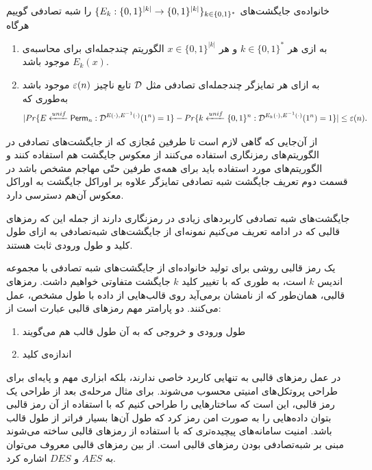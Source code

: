 \begin{definition}
خانواده‌ی جایگشت‌های 
$\{E_{k}:\{0, 1\}^{|k|}\rightarrow \{0, 1\}^{|k|}\}_{k\in\{0, 1\}^{\ast}}$
را شبه تصادفی گوییم هرگاه
\begin{enumerate}
\item
به ازی هر 
$k\in\{0, 1\}^{\ast}$
و هر 
$x\in\{0, 1\}^{|k|}$
الگوریتم چندجمله‌ای برای محاسبه‌ی 
$E_{k}(x)$
موجود باشد.
\item
به ازای هر تمایزگر چندجمله‌ای تصادفی مثل 
$\mathcal{D}$ 
تابع ناچیز 
$\varepsilon(n)$
موجود باشد به‌طوری که
  $$|Pr\{E\xleftarrow{{\tiny unif}}\mathsf{Perm}_{n}: \mathcal{D}^{E(\cdot), E^{-1}(\cdot)}(1^{n}) = 1\} - Pr\{k\xleftarrow{{\tiny unif}}\{0, 1\}^{n}:  \mathcal{D}^{E_{k}(\cdot), E^{-1}(\cdot)}(1^{n}) = 1\}| \leq \varepsilon(n).$$
\end{enumerate}
\end{definition}
از آن‌جایی که  گاهی لازم است تا طرفین مُجازی که از جایگشت‌های تصادفی در الگوریتم‌های رمزنگاری استفاده می‌کنند از معکوس جایگشت هم استفاده کنند و الگوریتم‌های مورد استفاده باید برای همه‌ی طرفین حتّی مهاجم مشخص باشد در قسمت دوم تعریف جایگشت شبه تصادفی تمایزگر علاوه بر اوراکل جایگشت به اوراکل معکوس آن‌هم دسترسی دارد.

جایگشت‌های شبه تصادفی کاربردهای زیادی در رمزنگاری دارند از جمله این که رمزهای قالبی که در ادامه تعریف می‌کنیم نمونه‌ای از جایگشت‌های شبه‌تصادفی به ازای طول  کلید  و طول ورودی ثابت هستند.


\begin{definition}
یک رمز قالبی 
روشی برای تولید خانواده‌ای از جایگشت‌های شبه تصادفی با مجموعه‌  اندیس 
$k$
است، به طوری که با تغییر کلید 
$k$
جایگشت متفاوتی خواهیم داشت. رمزهای قالبی، همان‌طور که از نامشان برمی‌آید روی قالب‌هایی از داده با طول مشخص،  عمل‌ می‌کنند. دو پارامتر مهم رمزهای قالبی عبارت است از:
\begin{enumerate}
\item
طول ورودی و خروجی که به آن طول قالب هم می‌گویند
\item
اندازه‌ی کلید 
\end{enumerate}
در عمل رمزهای قالبی به تنهایی کاربرد خاصی ندارند، بلکه ابزاری مهم و پایه‌ای برای طراحی پروتکل‌های امنیتی محسوب می‌شوند. برای مثال مرحله‌ی بعد از طراحی یک رمز قالبی، این  است که ساختارهایی را طراحی کنیم که با استفاده از آن رمز قالبی بتوان داده‌هایی را به صورت امن رمز کرد که طول آن‌ها  بسیار فراتر از طول قالب  باشد.  امنیت سامانه‌های پیچیده‌تری که با استفاده از رمزهای قالبی ساخته می‌شوند مبنی بر شبه‌تصادفی بودن رمزهای قالبی است. از بین رمزهای قالبی معروف می‌توان به 
$AES$
و 
$DES$
اشاره کرد. 
\end{definition}


